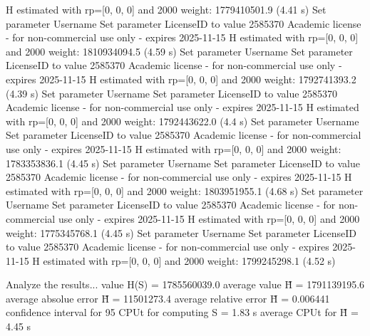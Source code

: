   H estimated with rp=[0, 0, 0] and 2000 weight:  1779410501.9  (4.41 s)
Set parameter Username
Set parameter LicenseID to value 2585370
Academic license - for non-commercial use only - expires 2025-11-15
  H estimated with rp=[0, 0, 0] and 2000 weight:  1810934094.5  (4.59 s)
Set parameter Username
Set parameter LicenseID to value 2585370
Academic license - for non-commercial use only - expires 2025-11-15
  H estimated with rp=[0, 0, 0] and 2000 weight:  1792741393.2  (4.39 s)
Set parameter Username
Set parameter LicenseID to value 2585370
Academic license - for non-commercial use only - expires 2025-11-15
  H estimated with rp=[0, 0, 0] and 2000 weight:  1792443622.0  (4.4 s)
Set parameter Username
Set parameter LicenseID to value 2585370
Academic license - for non-commercial use only - expires 2025-11-15
  H estimated with rp=[0, 0, 0] and 2000 weight:  1783353836.1  (4.45 s)
Set parameter Username
Set parameter LicenseID to value 2585370
Academic license - for non-commercial use only - expires 2025-11-15
  H estimated with rp=[0, 0, 0] and 2000 weight:  1803951955.1  (4.68 s)
Set parameter Username
Set parameter LicenseID to value 2585370
Academic license - for non-commercial use only - expires 2025-11-15
  H estimated with rp=[0, 0, 0] and 2000 weight:  1775345768.1  (4.45 s)
Set parameter Username
Set parameter LicenseID to value 2585370
Academic license - for non-commercial use only - expires 2025-11-15
  H estimated with rp=[0, 0, 0] and 2000 weight:  1799245298.1  (4.52 s)

Analyze the results...
  value H(S)                  = 1785560039.0 
  average value H̃             = 1791139195.6 
  average absolue error H̃     = 11501273.4 
  average relative error H̃    = 0.006441 
  confidence interval for 95%
  CPUt for computing S         = 1.83 s
  average CPUt for H̃           = 4.45 s

